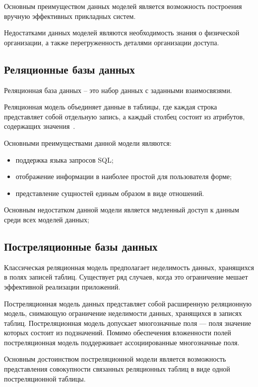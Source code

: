 Основным преимуществом данных моделей является возможность построения вручную эффективных прикладных систем.

Недостатками данных моделей являются необходимость знания о физической организации, а также перегруженность деталями организации доступа.

\subsection{Реляционные базы данных}

Реляционная база данных – это набор данных с заданными взаимосвязями.

Реляционная модель объединяет данные в таблицы, где каждая строка представляет собой отдельную запись, а каждый столбец состоит из атрибутов, содержащих значения~\cite{model-def}.

Основными преимуществами данной модели являются:

\begin{itemize}[label = ---]
    \item поддержка языка запросов SQL;
    \item отображение информации в наиболее простой для пользователя форме;
    \item представление сущностей единым образом в виде отношений.
\end{itemize}

Основным недостатком данной модели является медленный доступ к данным среди всех моделей данных;

\subsection{Постреляционные базы данных}

Классическая реляционная модель предполагает неделимость данных, хранящихся в полях записей таблиц. Существует ряд случаев, когда это ограничение мешает эффективной реализации приложений.

Постреляционная модель данных представляет собой расширенную реляционную модель, снимающую ограничение неделимости данных, хранящихся в записях таблиц. Постреляционная модель допускает многозначные поля --- поля значение которых состоит из подзначений. Помимо обеспечения вложенности полей постреляционная модель поддерживает ассоциированные многозначные поля.

Основным достоинством постреляционной модели является возможность представления совокупности связанных реляционных таблиц в виде одной постреляционной таблицы.

